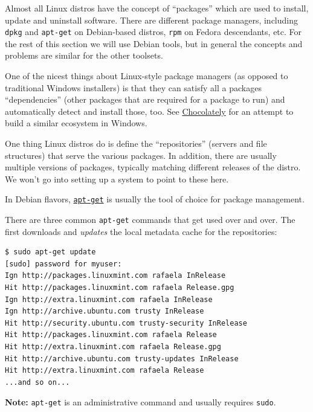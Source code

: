 \documentclass[10pt,]{book}
\numberwithin{figure}{chapter}
\begin{document}
Almost all Linux distros have the concept of ``packages'' which are used
to install, update and uninstall software. There are different package
managers, including \texttt{dpkg} and \texttt{apt-get} on Debian-based
distros, \texttt{rpm} on Fedora descendants, etc. For the rest of this
section we will use Debian tools, but in general the concepts and
problems are similar for the other toolsets.

One of the nicest things about Linux-style package managers (as opposed
to traditional Windows installers) is that they can satisfy all a
packages ``dependencies'' (other packages that are required for a
package to run) and automatically detect and install those, too. See
\href{https://chocolatey.org/}{Chocolately} for an attempt to build a
similar ecosystem in Windows.

One thing Linux distros do is define the ``repositories'' (servers and
file structures) that serve the various packages. In addition, there are
usually multiple versions of packages, typically matching different
releases of the distro. We won't go into setting up a system to point to
these here.

In Debian flavors,
\href{http://linux.die.net/man/8/apt-get}{\texttt{apt-get}} is usually
the tool of choice for package management.

There are three common \texttt{apt-get} commands that get used over and
over. The first downloads and \emph{updates} the local metadata cache
for the repositories:

\begin{verbatim}
$ sudo apt-get update
[sudo] password for myuser: 
Ign http://packages.linuxmint.com rafaela InRelease
Hit http://packages.linuxmint.com rafaela Release.gpg                          
Ign http://extra.linuxmint.com rafaela InRelease                               
Ign http://archive.ubuntu.com trusty InRelease                                 
Hit http://security.ubuntu.com trusty-security InRelease                       
Hit http://packages.linuxmint.com rafaela Release                              
Hit http://extra.linuxmint.com rafaela Release.gpg                             
Hit http://archive.ubuntu.com trusty-updates InRelease                         
Hit http://extra.linuxmint.com rafaela Release                
...and so on...
\end{verbatim}

\textbf{Note:} \texttt{apt-get} is an administrative command and usually
requires \texttt{sudo}.
\end{document}
